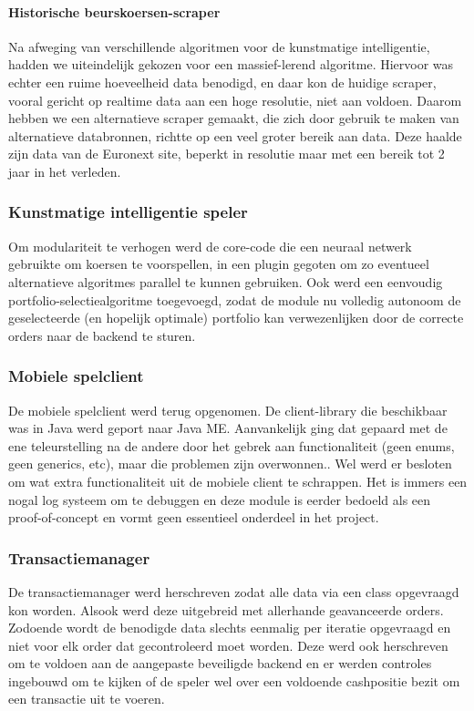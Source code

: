 \paragraph{Historische beurskoersen-scraper}
Na afweging van verschillende algoritmen voor de kunstmatige intelligentie, hadden we uiteindelijk gekozen voor een massief-lerend algoritme. Hiervoor was echter een ruime hoeveelheid data benodigd, en daar kon de huidige scraper, vooral gericht op realtime data aan een hoge resolutie, niet aan voldoen. Daarom hebben we een alternatieve scraper gemaakt, die zich door gebruik te maken van alternatieve databronnen, richtte op een veel groter bereik aan data. Deze haalde zijn data van de Euronext site, beperkt in resolutie maar met een bereik tot 2 jaar in het verleden.

\subsubsection{Kunstmatige intelligentie speler}
Om modulariteit te verhogen werd de core-code die een neuraal netwerk gebruikte om koersen te voorspellen, in een plugin gegoten om zo eventueel alternatieve algoritmes parallel te kunnen gebruiken. Ook werd een eenvoudig portfolio-selectiealgoritme toegevoegd, zodat de module nu volledig autonoom de geselecteerde (en hopelijk optimale) portfolio kan verwezenlijken door de correcte orders naar de backend te sturen.

\subsubsection{Mobiele spelclient}
De mobiele spelclient werd terug opgenomen. De client-library die beschikbaar was in Java werd geport naar Java ME. Aanvankelijk ging dat gepaard met de ene teleurstelling na de andere door het gebrek aan functionaliteit (geen enums, geen generics, etc), maar die problemen zijn overwonnen.. Wel werd er besloten om wat extra functionaliteit uit de mobiele client te schrappen. Het is immers een nogal log systeem om te debuggen en deze module is eerder bedoeld als een proof-of-concept en vormt geen essentieel onderdeel in het project.

\subsubsection{Transactiemanager}
De transactiemanager werd herschreven zodat alle data via een class opgevraagd kon worden. Alsook werd deze uitgebreid met allerhande geavanceerde orders.
Zodoende wordt de benodigde data slechts eenmalig per iteratie opgevraagd en niet voor elk order dat gecontroleerd moet worden. Deze werd ook herschreven om te voldoen aan de aangepaste beveiligde backend en er werden controles ingebouwd om te kijken of de speler wel over een voldoende cashpositie bezit om een transactie uit te voeren.


